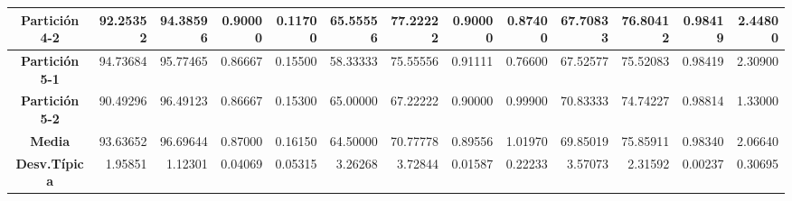 \documentclass[a4paper,11pt]{article}
\begin{document}
\begin{table}[H]
\begin{adjustbox}{width=1.1\textwidth}
\begin{tabular}{|c|r|r|r|r|r|r|r|r|r|r|r|r|}
    \textbf{Partición 4-2} & 92.25352 & 94.38596 & 0.90000 & 0.11700 & 65.55556 & 77.22222 & 0.90000 & 0.87400 & 67.70833 & 76.80412 & 0.98419 & 2.44800 \\ \hline
    \textbf{Partición 5-1} & 94.73684 & 95.77465 & 0.86667 & 0.15500 & 58.33333 & 75.55556 & 0.91111 & 0.76600 & 67.52577 & 75.52083 & 0.98419 & 2.30900 \\ \hline
    \textbf{Partición 5-2} & 90.49296 & 96.49123 & 0.86667 & 0.15300 & 65.00000 & 67.22222 & 0.90000 & 0.99900 & 70.83333 & 74.74227 & 0.98814 & 1.33000 \\ \hline
    \textbf{Media} & 93.63652 & 96.69644 & 0.87000 & 0.16150 & 64.50000 & 70.77778 & 0.89556 & 1.01970 & 69.85019 & 75.85911 & 0.98340 & 2.06640 \\ \hline
    \textbf{Desv.Típica} & 1.95851 & 1.12301 & 0.04069 & 0.05315 & 3.26268 & 3.72844 & 0.01587 & 0.22233 & 3.57073 & 2.31592 & 0.00237 & 0.30695 \\ \hline
    \end{tabular}
    \end{adjustbox}
    \label{SFS}
  \end{table}
  
\end{document}
